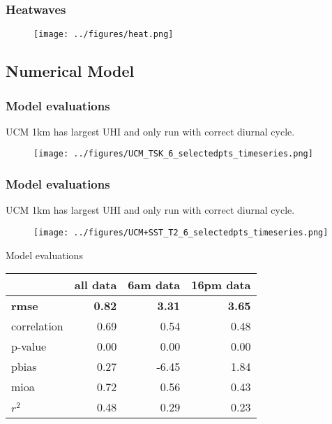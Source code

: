 \documentclass[aspectratio=169, 10pt]{beamer}
\begin{document}
\begin{frame}
\frametitle{Heatwaves}
\begin{figure}
\texttt{[image: ../figures/heat.png]}
\end{figure}
\end{frame}

\subsection{Numerical Model}


\begin{frame}
\frametitle{Model evaluations}
UCM 1km has largest UHI and only run with correct diurnal cycle. 
\begin{figure}
\texttt{[image: ../figures/UCM\_TSK\_6\_selectedpts\_timeseries.png]}
\end{figure}
\end{frame}

\begin{frame}
\frametitle{Model evaluations}
UCM 1km has largest UHI and only run with correct diurnal cycle. 
\begin{figure}
\texttt{[image: ../figures/UCM+SST\_T2\_6\_selectedpts\_timeseries.png]}
\end{figure}
\end{frame}

\begin{frame}{Model evaluations}
\center
\begin{tabular}{lrrr}
\toprule
{} &  all data &     6am data&   16pm data \\
\midrule
\bf rmse        &    \bf  0.82 & \bf 3.31 & \bf 3.65 \\
correlation &      0.69 &  0.54 & 0.48 \\
p-value     &      0.00 &  0.00 & 0.00 \\
pbias       &      0.27 & -6.45 & 1.84 \\
mioa        &      0.72 &  0.56 & 0.43 \\
$r^2$   &      0.48 &  0.29 & 0.23 \\
\bottomrule
\end{tabular}


\end{frame}
\end{document}
